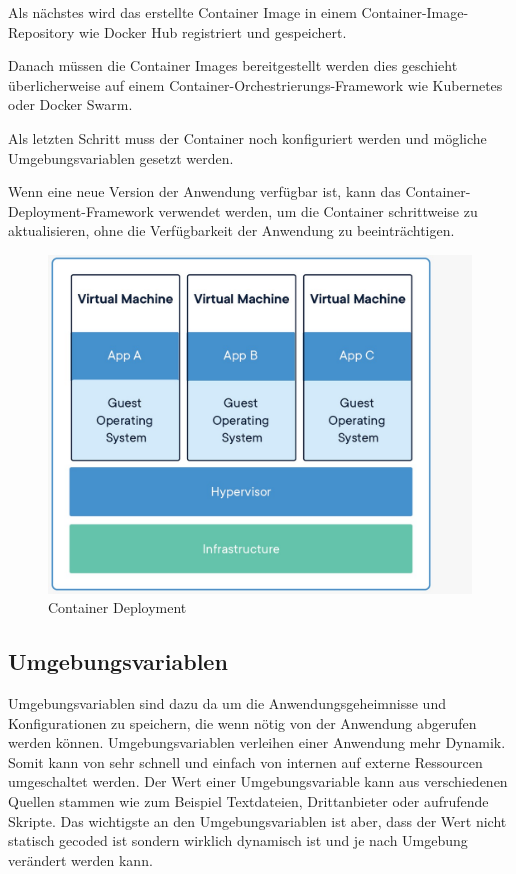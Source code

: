Als nächstes wird das erstellte Container Image in einem Container-Image-Repository wie Docker Hub registriert und gespeichert.

Danach müssen die Container Images bereitgestellt werden dies geschieht überlicherweise auf einem Container-Orchestrierungs-Framework wie Kubernetes oder Docker Swarm.

Als letzten Schritt muss der Container noch konfiguriert werden und mögliche Umgebungsvariablen gesetzt werden.

Wenn eine neue Version der Anwendung verfügbar ist, kann das Container-Deployment-Framework verwendet werden, um die Container schrittweise zu aktualisieren, ohne die Verfügbarkeit der Anwendung zu beeinträchtigen.


\begin{figure}[h!]
    \centering
    \includegraphics[width=0.8\linewidth]{pics/container_deployment.jpeg}
    \caption{Container Deployment}
    \label{fig:enter-label}
\end{figure}

\subsection{Umgebungsvariablen}

Umgebungsvariablen sind dazu da um die Anwendungsgeheimnisse und Konfigurationen zu speichern, die wenn nötig von der Anwendung abgerufen werden können. Umgebungsvariablen verleihen einer Anwendung mehr Dynamik. Somit kann von sehr schnell und einfach von internen auf externe Ressourcen umgeschaltet werden. Der Wert einer Umgebungsvariable kann aus verschiedenen Quellen stammen wie zum Beispiel Textdateien, Drittanbieter oder aufrufende Skripte. Das wichtigste an den Umgebungsvariablen ist aber, dass der Wert nicht statisch gecoded ist sondern wirklich dynamisch ist und je nach Umgebung verändert werden kann.

